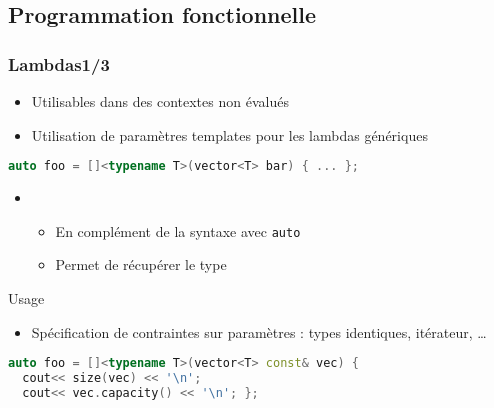 \documentclass[C++.tex]{subfiles}
\begin{document}
\subsection*{Programmation fonctionnelle}
\begin{frame}[fragile]
	\frametitle{Lambdas\titlehfill{}1/3}
	\begin{itemize}
		\item Utilisables dans des contextes non évalués


		\item Utilisation de paramètres templates pour les lambdas génériques
	\end{itemize}

	\begin{lstlisting}[language=C++]
auto foo = []<typename T>(vector<T> bar) { ... };\end{lstlisting}

	\begin{itemize}
		\item [] \begin{itemize}
			\item En complément de la syntaxe avec \lstinline|auto|


			\item Permet de récupérer le type
		\end{itemize}
	\end{itemize}

	\begin{block}{Usage}
		\begin{itemize}
			\item Spécification de contraintes sur paramètres : types identiques, itérateur, \ldots
		\end{itemize}
	\end{block}

	\begin{lstlisting}[language=C++]
auto foo = []<typename T>(vector<T> const& vec) { 
  cout<< size(vec) << '\n';
  cout<< vec.capacity() << '\n'; };\end{lstlisting}



\end{frame}
\end{document}
